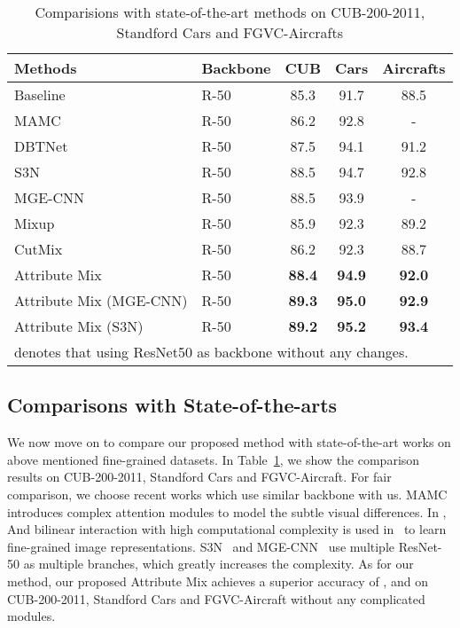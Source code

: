 \documentclass[runningheads]{llncs}
\begin{document}
\begin{table}[t]
\centering


\caption{Comparisions with state-of-the-art methods on CUB-200-2011, Standford Cars and FGVC-Aircrafts}
  \label{result_cub}
\fontsize{8.7pt}{12.5pt}\selectfont
\setlength\tabcolsep{4pt}
  \begin{tabular}{l|l|ccc}
  \hline
  Methods & Backbone & CUB & Cars & Aircrafts \\
  \hline
  Baseline& R-50  & 85.3 & 91.7 & 88.5 \\
  MAMC~\cite{sun2018multi}& R-50 &86.2 & 92.8 & -   \\

  DBTNet~\cite{zheng2019learning}&R-50 & 87.5 & 94.1 & 91.2  \\
  S3N ~\cite{ding2019selective}&R-50 & 88.5 & 94.7 & 92.8 \\
  MGE-CNN ~\cite{zhang2019learning} & R-50 & 88.5 & 93.9 & - \\

  Mixup~\cite{zhang2017mixup}&R-50  & 85.9 & 92.3 & 89.2  \\
  CutMix~\cite{yun2019cutmix}& R-50  & 86.2 & 92.3 & 88.7 \\

  \hline
  Attribute Mix &R-50  & \textbf{88.4} & \textbf{94.9} & \textbf{92.0}  \\
  Attribute Mix (MGE-CNN) &R-50 & \textbf{89.3} & \textbf{95.0} & \textbf{92.9}  \\
  Attribute Mix (S3N) &R-50 & \textbf{89.2} & \textbf{95.2} & \textbf{93.4}  \\
  \hline
  \multicolumn{5}{l}{ denotes that using ResNet50 as backbone without any changes.}
  \end{tabular}

  \vspace{-0.2cm}
\end{table}

\subsection{Comparisons with State-of-the-arts}
\noindent We now move on to compare our proposed method with state-of-the-art works on above mentioned fine-grained datasets. In Table~\ref{result_cub}, we show the comparison results on CUB-200-2011, Standford Cars and FGVC-Aircraft.  For fair comparison, we choose recent works which use similar backbone with us. MAMC~\cite{sun2018multi} introduces complex attention modules to model the subtle visual differences. In \cite{zheng2019learning}, And bilinear interaction with high computational complexity is used in~\cite{zheng2019learning} to learn fine-grained image representations. S3N~\cite{ding2019selective} and MGE-CNN~\cite{zhang2019learning} use multiple ResNet-50 as multiple branches, which greatly increases the complexity.  As for our method, our proposed Attribute Mix achieves a superior accuracy of ,  and  on CUB-200-2011, Standford Cars and FGVC-Aircraft without any complicated modules.
\end{document}
